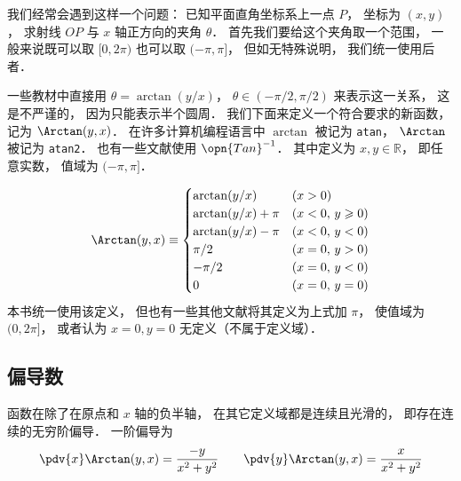 

我们经常会遇到这样一个问题： 已知平面直角坐标系上一点 $P$， 坐标为 $(x, y)$， 求射线 $OP$ 与 $x$ 轴正方向的夹角 $\theta$．%
首先我们要给这个夹角取一个范围， 一般来说既可以取 $[0, 2\pi)$ 也可以取 $(-\pi, \pi]$， 但如无特殊说明， 我们统一使用后者．

一些教材中直接用 $\theta = \arctan(y/x)$， $\theta \in (-\pi/2, \pi/2)$ 来表示这一关系， 这是不严谨的， 因为只能表示半个圆周． 我们下面来定义一个符合要求的新函数， 记为 $\Arctan(y, x)$． 在许多计算机编程语言中 $\arctan$ 被记为 \lstinline|atan|， $\Arctan$ 被记为 \lstinline|atan2|． 也有一些文献使用 $\opn{Tan}^{-1}$． 其中定义为 $x, y \in \mathbb R$， 即任意实数， 值域为 $(-\pi, \pi]$．

\begin{equation}\label{Arctan_eq1}
\Arctan(y,x) \equiv 
\begin{cases}
\arctan (y/x) \quad &(x > 0)\\
\arctan (y/x) + \pi  &(x < 0,\,y \geqslant 0)\\
\arctan (y/x) - \pi  &(x < 0,\,y < 0)\\
\pi /2  &(x = 0, \,y > 0)\\
 -\pi /2  &(x = 0, \,y < 0)\\
0 & (x=0,\,y=0)
\end{cases}
\end{equation}
本书统一使用该定义， 但也有一些其他文献将其定义为上式加 $\pi$， 使值域为 $(0, 2\pi]$， 或者认为 $x = 0, y = 0$ 无定义（不属于定义域）．

\subsection{偏导数}
函数在除了在原点和 $x$ 轴的负半轴， 在其它定义域都是连续且光滑的， 即存在连续的无穷阶偏导． 一阶偏导为
\begin{equation}
\pdv{x} \Arctan(y, x) = \frac{-y}{x^2 + y^2} \qquad
\pdv{y} \Arctan(y, x) = \frac{x}{x^2 + y^2}
\end{equation}
